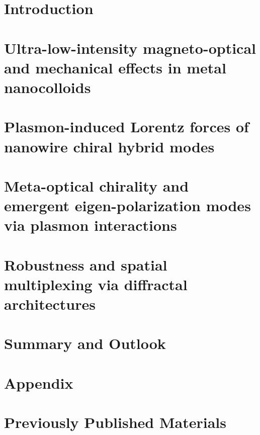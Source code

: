 \documentclass[letterpaper, 12pt, oneside]{book}
\begin{document}
\mainmatter

\chapter{Introduction}

\clearpage

\chapter{Ultra-low-intensity magneto-optical and mechanical effects in metal nanocolloids}

\clearpage

\chapter{Plasmon-induced Lorentz forces of nanowire chiral hybrid modes}

\clearpage

\chapter{Meta-optical chirality and emergent eigen-polarization modes via plasmon interactions}

\clearpage

\chapter{Robustness and spatial multiplexing via diffractal architectures}

\clearpage

\chapter{Summary and Outlook}


\chapter{Appendix}


\chapter*{Previously Published Materials}
\label{chap:ppm}



\clearpage
\clearpage


\singlespacing


\end{document}
